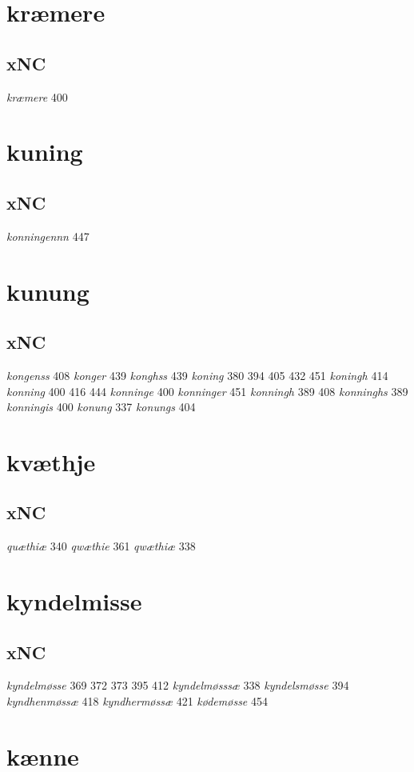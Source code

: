 \documentclass[a4paper,twocolumn]{article}
\begin{document}
\section{kræmere}
\label{sec:orgb4fc5f5}
\subsection{xNC}
\label{sec:orgee22d19}
\emph{kræmere} 400 
\section{kuning}
\label{sec:org41e6e20}
\subsection{xNC}
\label{sec:org3cfd27a}
\emph{konningennn} 447 
\section{kunung}
\label{sec:orgb233a02}
\subsection{xNC}
\label{sec:org6bc2af4}
\emph{kongenss} 408 \emph{konger} 439 \emph{konghss} 439 \emph{koning} 380 394 405 432 451 \emph{koningh} 414 \emph{konning} 400 416 444 \emph{konninge} 400 \emph{konninger} 451 \emph{konningh} 389 408 \emph{konninghs} 389 \emph{konningis} 400 \emph{konung} 337 \emph{konungs} 404 
\section{kvæthje}
\label{sec:orge84667b}
\subsection{xNC}
\label{sec:org6893edb}
\emph{quæthiæ} 340 \emph{qwæthie} 361 \emph{qwæthiæ} 338 
\section{kyndelmisse}
\label{sec:org0230a46}
\subsection{xNC}
\label{sec:orgdfc993d}
\emph{kyndelmøsse} 369 372 373 395 412 \emph{kyndelmøsssæ} 338 \emph{kyndelsmøsse} 394 \emph{kyndhenmøssæ} 418 \emph{kyndhermøssæ} 421 \emph{kødemøsse} 454 
\section{kænne}
\label{sec:org37fdb3c}
\end{document}
